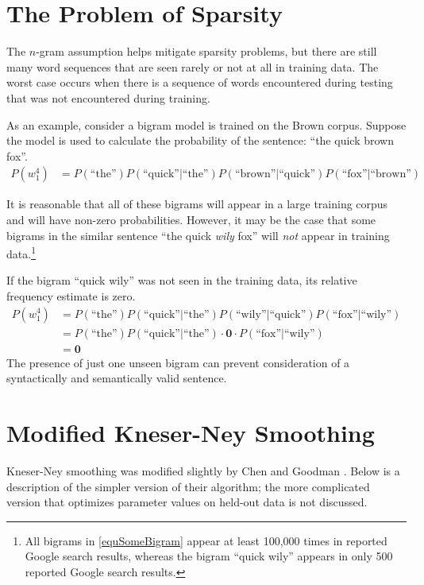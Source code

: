 \documentclass[10pt]{article}
\newcommand{\bs}[1]{\boldsymbol{#1}}
\newcommand{\ngram}{$n$-gram\xspace}
\newcommand{\prb}[1]{P\left(#1\right)}
\begin{document}
\section{The Problem of Sparsity}
The \ngram assumption helps mitigate sparsity problems, but there are still many word sequences that are seen rarely or not at all in training data.
The worst case occurs when there is a sequence of words encountered during testing that was not encountered during training.

As an example, consider a bigram model is trained on the Brown corpus.
Suppose the model is used to calculate the probability of the sentence: ``the quick brown fox''.
\begin{align}
\prb{w_1^4} &= P(\text{``the''}) P(\text{``quick''$|$``the''}) P(\text{``brown''$|$``quick''}) P(\text{``fox''$|$``brown''}) \label{equSomeBigram}
\end{align}

It is reasonable that all of these bigrams will appear in a large training corpus and will have non-zero probabilities.
However, it may be the case that some bigrams in the similar sentence ``the quick \emph{wily} fox'' will \emph{not} appear in training 
data.\footnote{All bigrams in \ref{equSomeBigram} appear at least 100,000 times in reported Google search results, whereas the bigram ``quick wily'' appears in only 500 reported Google search results.}

If the bigram ``quick wily'' was not seen in the training data, its relative frequency estimate is zero.
\begin{align}
\prb{w_1^4} &= P(\text{``the''}) P(\text{``quick''$|$``the''}) P(\text{``wily''$|$``quick''}) P(\text{``fox''$|$``wily''}) \label{equZeroBigram} \\
&= P(\text{``the''}) P(\text{``quick''$|$``the''}) \cdot \bs{0} \cdot P(\text{``fox''$|$``wily''}) \\
&= \bs{0}
\end{align}
The presence of just one unseen bigram can prevent consideration of a syntactically and semantically valid sentence.


\section{Modified Kneser-Ney Smoothing}
Kneser-Ney smoothing \cite{kneser1995improved} was modified slightly by Chen and Goodman \cite{chen1998empirical}.
Below is a description of the simpler version of their algorithm; the more complicated version that optimizes parameter values on held-out data is not discussed.
\end{document}
